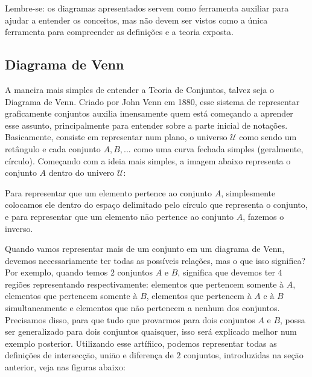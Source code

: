     Lembre-se: os diagramas apresentados servem como ferramenta auxiliar para ajudar a entender os conceitos, mas não devem ser vistos como a única ferramenta para compreender as definições e  a teoria exposta.
    
    \newpage
    \subsection{Diagrama de Venn}
    A maneira mais simples de entender a Teoria de Conjuntos, talvez seja o Diagrama de Venn. Criado por John Venn em 1880, esse sistema de representar graficamente conjuntos auxilia imensamente quem está começando a aprender esse assunto, principalmente para entender sobre a parte inicial de notações. Basicamente, consiste em representar num plano, o universo $\mathcal U$ como sendo um retângulo e cada conjunto $A,B,...$ como uma curva fechada simples (geralmente, círculo). Começando com a ideia mais simples, a imagem abaixo representa o conjunto $A$ dentro do univero $\mathcal U$:
    
    
    Para representar que um elemento pertence ao conjunto $A$, simplesmente colocamos ele dentro do espaço delimitado pelo círculo que representa o conjunto, e para representar que um elemento nāo pertence ao conjunto $A$, fazemos o inverso.
    
    
    
    Quando vamos representar mais de um conjunto em um diagrama de Venn, devemos necessariamente ter todas as possíveis relações, mas o que isso significa? Por exemplo, quando temos $2$ conjuntos $A$ e $B$, significa que devemos ter $4$ regiões representando respectivamente: elementos que pertencem somente à $A$, elementos que pertencem somente à $B$, elementos que pertencem à $A$ e à $B$ simultaneamente e elementos que não pertencem a nenhum dos conjuntos. Precisamos disso, para que tudo que provarmos para dois conjuntos $A$ e $B$, possa ser generalizado para dois conjuntos quaisquer, isso será explicado melhor num exemplo posterior.
    Utilizando esse artífiico, podemos representar todas as definições de intersecçāo, uniāo e diferença de $2$ conjuntos, introduzidas na seçāo anterior, veja nas figuras abaixo:
    
